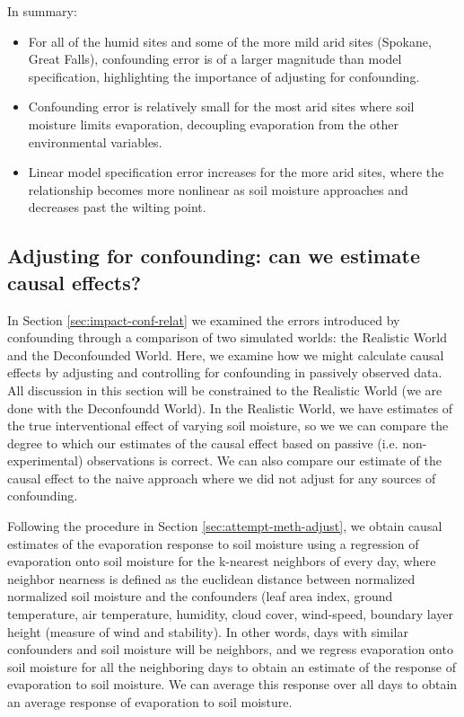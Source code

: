 \documentclass[12pt]{article}
\begin{document}
In summary:

\begin{itemize}
\item For all of the humid sites and some of the more mild arid sites
  (Spokane, Great Falls), confounding error is of a larger magnitude
  than model specification, highlighting the importance of adjusting
  for confounding.
\item Confounding error is relatively small for the most arid sites
  where soil moisture limits evaporation, decoupling evaporation from
  the other environmental variables.
\item Linear model specification error increases for the more arid
  sites, where the relationship becomes more nonlinear as soil
  moisture approaches and decreases past the wilting point.
\end{itemize}

\subsection{Adjusting for confounding: can we estimate causal effects?}
\label{sec:adjust-conf-can}

In Section \ref{sec:impact-conf-relat} we examined the errors
introduced by confounding through a comparison of two simulated
worlds: the Realistic World and the Deconfounded World. Here, we
examine how we might calculate causal effects by adjusting and
controlling for confounding in passively observed data. All discussion
in this section will be constrained to the Realistic World (we are
done with the Deconfoundd World). In the Realistic World, we have
estimates of the true interventional effect of varying soil moisture,
so we we can compare the degree to which our estimates of the causal
effect based on passive (i.e. non-experimental) observations is
correct. We can also compare our estimate of the causal effect to the
naive approach where we did not adjust for any sources of confounding.

Following the procedure in Section \ref{sec:attempt-meth-adjust}, we
obtain causal estimates of the evaporation response to soil moisture
using a regression of evaporation onto soil moisture for the k-nearest
neighbors of every day, where neighbor nearness is defined as the
euclidean distance between normalized normalized soil moisture and the
confounders (leaf area index, ground temperature, air temperature,
humidity, cloud cover, wind-speed, boundary layer height (measure of
wind and stability). In other words, days with similar confounders and
soil moisture will be neighbors, and we regress evaporation onto soil
moisture for all the neighboring days to obtain an estimate of the
response of evaporation to soil moisture. We can average this response
over all days to obtain an average response of evaporation to soil
moisture.
\end{document}
